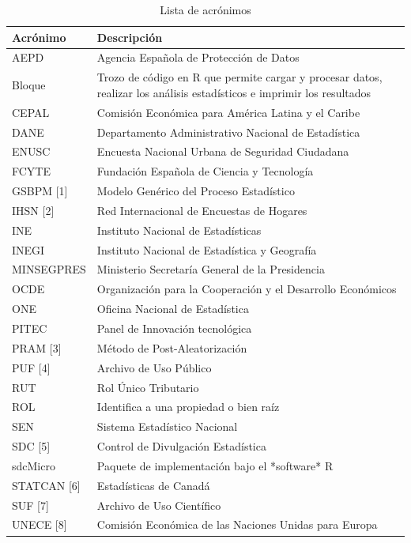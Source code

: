 \documentclass[]{book}
\theoremstyle{definition}
\theoremstyle{definition}
\theoremstyle{definition}
\theoremstyle{definition}
\theoremstyle{remark}
\begin{document}
\begin{table}

\caption{\label{tab:tabAcron1}Lista de acrónimos}
\centering
\begin{tabular}[t]{l|l}
\hline
Acrónimo & Descripción\\
\hline
AEPD & Agencia Española de Protección de Datos\\
\hline
Bloque & Trozo de código en R que permite cargar y procesar datos, realizar los análisis estadísticos e imprimir los resultados\\
\hline
CEPAL & Comisión Económica para América Latina y el Caribe\\
\hline
DANE & Departamento Administrativo Nacional de Estadística\\
\hline
ENUSC & Encuesta Nacional Urbana de Seguridad Ciudadana\\
\hline
FCYTE & Fundación Española de Ciencia y Tecnología\\
\hline
GSBPM [1] & Modelo Genérico del Proceso Estadístico\\
\hline
IHSN [2] & Red Internacional de Encuestas de Hogares\\
\hline
INE & Instituto Nacional de Estadísticas\\
\hline
INEGI & Instituto Nacional de Estadística y Geografía\\
\hline
MINSEGPRES & Ministerio Secretaría General de la Presidencia\\
\hline
OCDE & Organización para la Cooperación y el Desarrollo Económicos\\
\hline
ONE & Oficina Nacional de Estadística\\
\hline
PITEC & Panel de Innovación tecnológica\\
\hline
PRAM [3] & Método de Post-Aleatorización\\
\hline
PUF [4] & Archivo de Uso Público\\
\hline
RUT & Rol Único Tributario\\
\hline
ROL & Identifica a una propiedad o bien raíz\\
\hline
SEN & Sistema Estadístico Nacional\\
\hline
SDC [5] & Control de Divulgación Estadística\\
\hline
sdcMicro & Paquete de implementación bajo el *software* R\\
\hline
STATCAN [6] & Estadísticas de Canadá\\
\hline
SUF [7] & Archivo de Uso Científico\\
\hline
UNECE [8] & Comisión Económica de las Naciones Unidas para Europa\\
\hline
\end{tabular}
\end{table}
\end{document}
